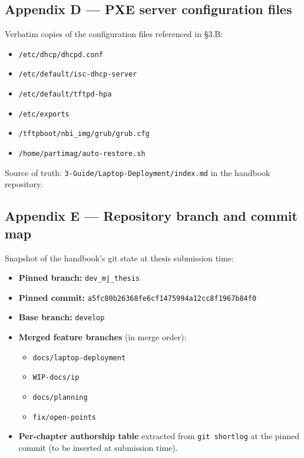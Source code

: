 \hypertarget{appendix-d-pxe-server-configuration-files}{%
\subsection{Appendix D --- PXE server configuration
files}\label{appendix-d-pxe-server-configuration-files}}

Verbatim copies of the configuration files referenced in §3.B:

\begin{itemize}
\tightlist
\item
  \texttt{/etc/dhcp/dhcpd.conf}
\item
  \texttt{/etc/default/isc-dhcp-server}
\item
  \texttt{/etc/default/tftpd-hpa}
\item
  \texttt{/etc/exports}
\item
  \texttt{/tftpboot/nbi\_img/grub/grub.cfg}
\item
  \texttt{/home/partimag/auto-restore.sh}
\end{itemize}

Source of truth: \texttt{3-Guide/Laptop-Deployment/index.md} in the
handbook repository.

\hypertarget{appendix-e-repository-branch-and-commit-map}{%
\subsection{Appendix E --- Repository branch and commit
map}\label{appendix-e-repository-branch-and-commit-map}}

Snapshot of the handbook's git state at thesis submission time:

\begin{itemize}
\tightlist
\item
  \textbf{Pinned branch:} \texttt{dev\_mj\_thesis}
\item
  \textbf{Pinned commit:}
  \texttt{a5fc80b26368fe6cf1475994a12cc8f1967b84f0}
\item
  \textbf{Base branch:} \texttt{develop}
\item
  \textbf{Merged feature branches} (in merge order):

  \begin{itemize}
  \tightlist
  \item
    \texttt{docs/laptop-deployment}
  \item
    \texttt{WIP-docs/ip}
  \item
    \texttt{docs/planning}
  \item
    \texttt{fix/open-points}
  \end{itemize}
\item
  \textbf{Per-chapter authorship table} extracted from
  \texttt{git\ shortlog} at the pinned commit (to be inserted at
  submission time).
\end{itemize}

